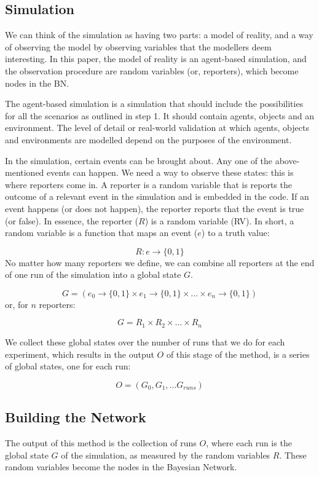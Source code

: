 \documentclass[11pt]{article}
\begin{document}
\subsection{Simulation}
We can think of the simulation as having two parts: a model of reality, and a way of observing the model by observing variables that the modellers deem interesting. In this paper, the model of reality is an agent-based simulation, and the observation procedure are random variables (or, reporters), which become nodes in the BN.

The agent-based simulation is a simulation that should include the possibilities for all the scenarios as outlined in step 1. It should contain agents, objects and an environment. The level of detail or real-world validation at which agents, objects and environments are modelled depend on the purposes of the environment.


In the simulation, certain events can be brought about. Any one of the above-mentioned events can happen. We need a way to observe these states: this is where reporters come in. A reporter is a random variable that is reports the outcome of a relevant event in the simulation and is embedded in the code. If an event happens (or does not happen), the reporter reports that the event is true (or false). In essence, the reporter ($R$) is a random variable (RV). In short, a random variable is a function that maps an event ($e$) to a truth value:

\[ R : e \rightarrow \{0, 1\} \]
No matter how many reporters we define, we can combine all reporters at the end of one run of the simulation into a global state $G$.

\[ G = (e_0 \rightarrow \{0, 1\} \times e_1 \rightarrow \{0, 1\} \times ... \times e_n \rightarrow \{0, 1\})\]
 or, for $n$ reporters:
 
\[ G = R_1 \times R_2 \times... \times R_n\]

We collect these global states over the number of runs that we do for each experiment, which results in the output $O$ of this stage of the method, is a series of global states, one for each run:

\[ O = (G_0, G_1, ... G_{runs})\]


\subsection{Building the Network}
The output of this method is the collection of runs $O$, where each run is the global state $G$ of the simulation, as measured by the random variables $R$. These random variables become the nodes in the Bayesian Network.
\end{document}
